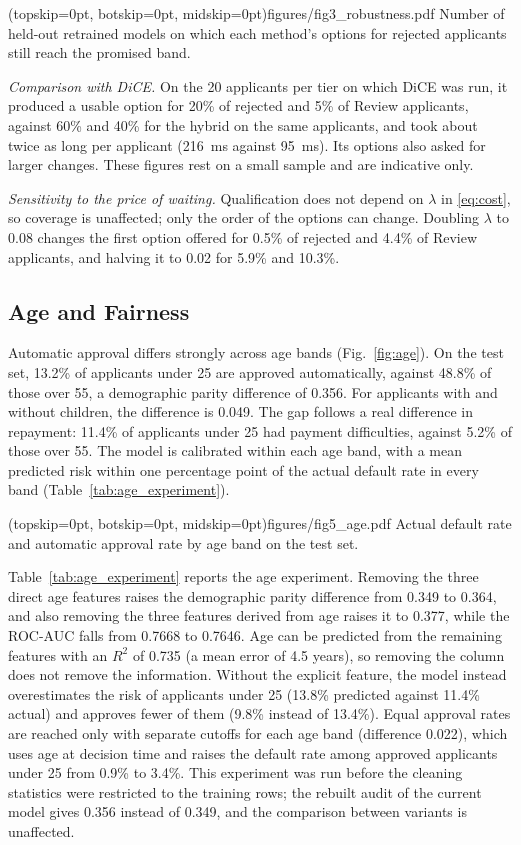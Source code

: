 \Figure[t!](topskip=0pt, botskip=0pt, midskip=0pt){figures/fig3_robustness.pdf}
{Number of held-out retrained models on which each method's options for rejected applicants still reach the promised
band.\label{fig:robustness}}

\emph{Comparison with DiCE.} On the 20 applicants per tier on which DiCE was run, it produced a usable option for 20\%
of rejected and 5\% of Review applicants, against 60\% and 40\% for the hybrid on the same applicants, and took about
twice as long per applicant (216~ms against 95~ms). Its options also asked for larger changes. These figures rest on
a small sample and are indicative only.

\emph{Sensitivity to the price of waiting.} Qualification does not depend on $\lambda$ in \eqref{eq:cost}, so coverage
is unaffected; only the order of the options can change. Doubling $\lambda$ to 0.08 changes the first option offered for
0.5\% of rejected and 4.4\% of Review applicants, and halving it to 0.02 for 5.9\% and 10.3\%.

\subsection{Age and Fairness}
\label{sec:age}
Automatic approval differs strongly across age bands (Fig.~\ref{fig:age}). On the test set, 13.2\% of applicants
under 25 are approved automatically, against 48.8\% of those over 55, a demographic parity difference of 0.356. For applicants with and without children, the difference is 0.049. The gap
follows a real difference in repayment: 11.4\% of applicants under 25 had payment difficulties, against 5.2\% of those
over 55. The model is calibrated within each age band, with a mean predicted risk within one percentage point of the
actual default rate in every band (Table~\ref{tab:age_experiment}).

\Figure[t!](topskip=0pt, botskip=0pt, midskip=0pt){figures/fig5_age.pdf}
{Actual default rate and automatic approval rate by age band on the test set.\label{fig:age}}

Table~\ref{tab:age_experiment} reports the age experiment. Removing the three direct age features raises the
demographic parity difference from 0.349 to 0.364, and also removing the three features derived from age raises it to
0.377, while the ROC-AUC falls from 0.7668 to 0.7646. Age can be predicted from the remaining features with an $R^2$ of
0.735 (a mean error of 4.5 years), so removing the column does not remove the information. Without the explicit
feature, the model instead overestimates the risk of applicants under 25 (13.8\% predicted against 11.4\% actual) and
approves fewer of them (9.8\% instead of 13.4\%). Equal approval rates are reached only with separate cutoffs for each
age band (difference 0.022), which uses age at decision time and raises the default rate among approved applicants
under 25 from 0.9\% to 3.4\%. This experiment was run before the cleaning statistics were restricted to the training
rows; the rebuilt audit of the current model gives 0.356 instead of 0.349, and the comparison between variants is
unaffected.

